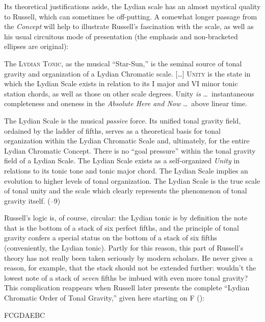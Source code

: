 Its theoretical justifications aside, the Lydian scale has an almost mystical
quality to Russell, which can sometimes be off-putting. A somewhat longer
passage from the \emph{Concept} will help to illustrate Russell's fascination
with the scale, as well as his usual circuitous mode of presentation (the
emphasis and non-bracketed ellipses are original):
%
\begin{quoting}
  \singlespacing
  The \textsc{Lydian Tonic}, as the musical ``Star-Sun,'' is the seminal
  source of tonal gravity and organization of a Lydian Chromatic scale.
  [\ldots] \textsc{Unity} is the state in which the Lydian Scale exists in
  relation to its I major and VI minor tonic station chords, as well as those
  on other scale degrees. Unity \emph{is} \ldots\ instantaneous completeness
  and oneness in the \emph{Absolute Here and Now} \ldots\ above linear time.

  The Lydian Scale is the musical \emph{passive} force. Its unified tonal
  gravity field, ordained by the ladder of fifths, serves as a theoretical
  basis for tonal organization within the Lydian Chromatic Scale and,
  ultimately, for the entire Lydian Chromatic Concept. There is no ``goal
  pressure'' within the tonal gravity field of a Lydian Scale. The Lydian
  Scale exists as a self-organized \emph{Unity} in relations to its tonic tone
  and tonic major chord. The Lydian Scale implies an evolution to higher
  levels of tonal organization. The Lydian Scale is the true scale of tonal
  unity and the scale which clearly represents the phenomenon of tonal gravity
  itself. (--9)
\end{quoting}

Russell's logic is, of course, circular: the Lydian tonic is by definition the
note that is the bottom of a stack of six perfect fifths, and the principle of
tonal gravity confers a special status on the bottom of a stack of six fifths
(conveniently, the Lydian tonic). Partly for this reason, this part of
Russell's theory has not really been taken seriously by modern scholars. He
never gives a reason, for example, that the stack should not be extended
further: wouldn't the lowest note of a stack of \emph{seven} fifths be imbued
with even more tonal gravity? This complication reappears when Russell later
presents the complete ``Lydian Chromatic Order of Tonal Gravity,'' given here
starting on F (): \\
{\centering F\quad C\quad G\quad D\quad A\quad E\quad B\quad C\sharp\quad
  \Aflat\quad \Eflat\quad \Bflat\quad \Gflat \par}

